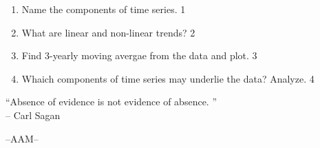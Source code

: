 \documentclass[12pt]{article}
\begin{document}
\begin{enumerate}
  \begin{enumerate}
    \item
	Name the components of time series. \hfill 1
    \item
	What are linear and non-linear trends? \hfill 2
    \item  
	Find 3-yearly moving avergae from the data and plot. \hfill 3
    \item
	Whaich components of time series may underlie the data? Analyze. \hfill 4
  \end{enumerate}

  
\end{enumerate}

 \vspace{2.5cm}

\begin{center}
 “Absence of evidence is not evidence of absence. ” \\ -- Carl Sagan
 

  
  \vfill
  --AAM--
\end{center}
\end{document}
